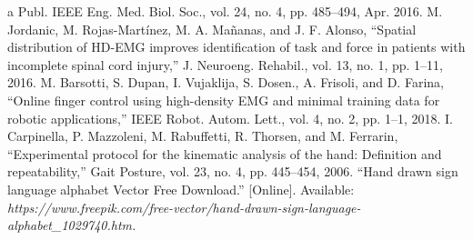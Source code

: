 \documentclass[conference]{IEEEtran}
\begin{document}
\begin{thebibliography}{00}
a Publ. IEEE Eng. Med. Biol. Soc., vol. 24, no. 4, pp. 485–494, Apr. 2016.
 M. Jordanic, M. Rojas-Martínez, M. A. Mañanas, and J. F. Alonso, “Spatial distribution of HD-EMG 
improves identification of task and force in patients with incomplete spinal cord injury,” J. Neuroeng. 
Rehabil., vol. 13, no. 1, pp. 1–11, 2016.
  M. Barsotti, S. Dupan, I. Vujaklija, S. Dosen., A. Frisoli, and D. Farina, “Online finger control using 
high-density EMG and minimal training data for robotic applications,” IEEE Robot. Autom. Lett., 
vol. 4, no. 2, pp. 1–1, 2018.
 I. Carpinella, P. Mazzoleni, M. Rabuffetti, R. Thorsen, and M. Ferrarin, “Experimental protocol for 
the kinematic analysis of the hand: Definition and repeatability,” Gait Posture, vol. 23, no. 4, pp. 
445–454, 2006.
 “Hand drawn sign language alphabet Vector Free Download.” [Online]. Available: 
\textit{https://www.freepik.com/free-vector/hand-drawn-sign-language-alphabet_1029740.htm.}


\end{thebibliography}
\end{document}
